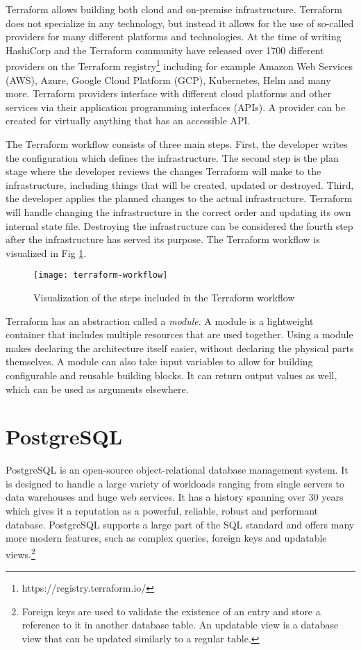 Terraform allows building both cloud and on-premise infrastructure.
Terraform does not specialize in any technology, but instead it allows for the use of so-called providers for many different platforms and technologies.
At the time of writing HashiCorp and the Terraform community have released over 1700 different providers on the Terraform registry\footnote{https://registry.terraform.io/} including for example Amazon Web Services (AWS), Azure, Google Cloud Platform (GCP), Kubernetes, Helm and many more.
Terraform providers interface with different cloud platforms and other services via their application programming interfaces (APIs).
A provider can be created for virtually anything that has an accessible API.
\cite{terraform}

The Terraform workflow consists of three main steps.
First, the developer writes the configuration which defines the infrastructure.
The second step is the plan stage where the developer reviews the changes Terraform will make to the infrastructure, including things that will be created, updated or destroyed.
Third, the developer applies the planned changes to the actual infrastructure.
Terraform will handle changing the infrastructure in the correct order and updating its own internal state file.
Destroying the infrastructure can be considered the fourth step after the infrastructure has served its purpose.
\cite{terraform}
The Terraform workflow is visualized in Fig \ref{fig:terraform-workflow}.

\begin{figure}[!htb]
\centering
\texttt{[image: terraform-workflow]}
\caption{Visualization of the steps included in the Terraform workflow}
\label{fig:terraform-workflow}
\end{figure}

Terraform has an abstraction called a \textit{module}.
A module is a lightweight container that includes multiple resources that are used together.
Using a module makes declaring the architecture itself easier, without declaring the physical parts themselves.
A module can also take input variables to allow for building configurable and reusable building blocks.
It can return output values as well, which can be used as arguments elsewhere.
\cite{terraform}

\section{PostgreSQL}

PostgreSQL is an open-source object-relational database management system.
It is designed to handle a large variety of workloads ranging from single servers to data warehouses and huge web services.
It has a history spanning over 30 years which gives it a reputation as a powerful, reliable, robust and performant database.
PostgreSQL supports a large part of the SQL standard and offers many more modern features, such as complex queries, foreign keys and updatable views.\footnote{Foreign keys are used to validate the existence of an entry and store a reference to it in another database table. An updatable view is a database view that can be updated similarly to a regular table.}
\cite{postgresql}

